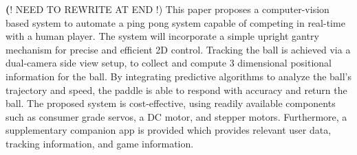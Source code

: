 \textbf(! NEED TO REWRITE AT END !)
This paper proposes a computer-vision based system to automate a ping pong system capable of competing in real-time with a human player. The system will incorporate a simple upright gantry mechanism for precise and efficient 2D control. Tracking the ball is achieved via a dual-camera side view setup, to collect and compute 3 dimensional positional information for the ball. By integrating predictive algorithms to analyze the ball's trajectory and speed, the paddle is able to respond with accuracy and return the ball. The proposed system is cost-effective, using readily available components such as consumer grade servos, a DC motor, and stepper motors. Furthermore, a supplementary companion app is provided which provides relevant user data, tracking information, and game information.